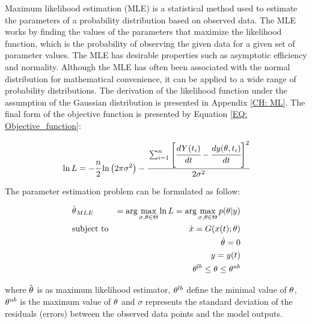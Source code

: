 \documentclass[../Article_Model_Parameters.tex]{subfiles}
\begin{document}
	Maximum likelihood estimation (MLE) is a statistical method used to estimate the parameters of a probability distribution based on observed data. The MLE works by finding the values of the parameters that maximize the likelihood function, which is the probability of observing the given data for a given set of parameter values. The MLE has desirable properties such as asymptotic efficiency and normality. Although the MLE has often been associated with the normal distribution for mathematical convenience, it can be applied to a wide range of probability distributions. The derivation of the likelihood function under the assumption of the Gaussian distribution is presented in Appendix \ref{CH: ML}. The final form of the objective function is presented by Equation \ref{EQ: Objective_function}:
	
	{\footnotesize
		\begin{equation} \label{EQ: Objective_function}
			\ln L = -\cfrac{n}{2}  \ln \left(2 \pi \sigma^2\right) 
			- \cfrac{ \sum_{i=1}^{n} \left[  \cfrac{d {Y}(t_i)}{dt} - \cfrac{d{\color{black}y}({\color{black} \theta}, t_i)}{dt} \right]^2 }{2 {\color{black} \sigma}^2}
		\end{equation}
	}
	
	The parameter estimation problem can be formulated as follow:
	
	{\footnotesize
		\begin{equation}
			\begin{aligned} \label{EQ: Optimization_formulation_MLE}
				&\hat{{\color{black} \theta}}_{MLE} &= \arg \max_{{\color{black} \sigma}, {\color{black} \theta} \in \Theta} \ln L = \arg \max_{{\color{black} \sigma},{\color{black} \theta} \in \Theta} p({\color{black} \theta}|{\color{black}y}) \\
				&\text{subject to}
				& \dot{ {\color{black}x} } = {\color{black}G}({\color{black} x}(t);{\color{black} \theta}) \\
				&& {\color{black} \dot{\theta}} = 0 \\
				&& {\color{black}y} = {\color{black}y}(t) \\
				&& {\color{black} \theta}^{lb} \leq {\color{black} \theta} \leq {\color{black} \theta}^{ub}
			\end{aligned}
	\end{equation} } 
	
	where $\hat{{\color{black} \theta}}$ is as maximum likelihood estimator, ${\color{black} \theta}^{lb}$ define the minimal value of ${\color{black} \theta}$, ${\color{black} \theta}^{ub}$ is the maximum value of ${\color{black} \theta}$ and $\sigma$ represents the standard deviation of the residuals (errors) between the observed data points and the model outputs.
		
\end{document}
